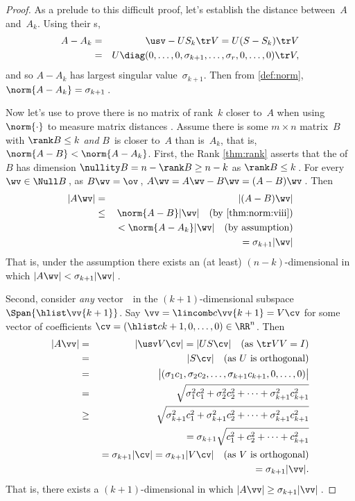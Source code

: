 \begin{proof} 
As a prelude to this difficult proof, let's establish the distance between~\(A\) and~\(A_k\). 
Using their \svd{}s,
\begin{eqnarray*}
A-A_k&=&\usv-US_k\tr V=U(S-S_k)\tr V
\\&=&U\diag(0,\ldots,0,\sigma_{k+1},\ldots,\sigma_r,0,\ldots,0)\tr V,
\end{eqnarray*}
and so \(A-A_k\) has largest singular value~\(\sigma_{k+1}\).
Then from \cref{def:norm}, \(\norm{A-A_k}=\sigma_{k+1}\)\,.

Now let's use  to prove there is no matrix of rank~\(k\) closer to~\(A\) when using \(\norm{\cdot}\) to measure matrix distances \cite[p.36]{Trefethen1997}.
Assume there is some \(m\times n\) matrix~\(B\) with \(\rank B\leq k\) \emph{and} \(B\)~is closer to~\(A\) than is~\(A_k\), that is, \(\norm{A-B}<\norm{A-A_k}\).
First, the Rank \cref{thm:rank} asserts that the  of~\(B\) has dimension \(\nullity B =n-\rank B\geq n-k\) as  \(\rank B\leq k\)\,.
For every \(\wv\in\Null B\)\,,  as \(B\wv=\ov\)\,,  \(A\wv=A\wv-B\wv=(A-B)\wv\)\,. 
Then
\begin{eqnarray*}
|A\wv|&=&|(A-B)\wv|
\\&\leq&\norm{A-B}|\wv| 
\quad(\text{by \cref{thm:norm:viii}})
\\&&{}<\norm{A-A_k}|\wv|
\quad(\text{by assumption})
\\&&\phantom{{}<}{}=\sigma_{k+1}|\wv|
\end{eqnarray*}
That is, under the assumption there exists an (at least) \((n-k)\)-dimensional  in which \(|A\wv|<\sigma_{k+1}|\wv|\)\,.

Second, consider \emph{any} vector~\vv\ in the \((k+1)\)-dimensional subspace \(\Span\{\hlist\vv{k+1}\}\).
Say \(\vv=\lincomb c\vv{k+1}=V\cv\) for some vector of coefficients \(\cv=(\hlist c{k+1},0,\ldots,0)\in\RR^n\).
Then
\begin{eqnarray*}
|A\vv|&=&|\usv V\cv|
=|US\cv| \quad(\text{as }\tr VV=I)
\\&=&|S\cv| \quad(\text{as \(U\) is orthogonal})
\\&=&\big|(\sigma_1c_1,\sigma_2c_2,\ldots,\sigma_{k+1}c_{k+1},0,\ldots,0)\big|
\\&=&\sqrt{\sigma_1^2c_1^2+\sigma_2^2c_2^2+\cdots+\sigma_{k+1}^2c_{k+1}^2}
\\&\geq&\sqrt{\sigma_{k+1}^2c_1^2+\sigma_{k+1}^2c_2^2+\cdots+\sigma_{k+1}^2c_{k+1}^2}
\\&&{}=\sigma_{k+1}\sqrt{c_1^2+c_2^2+\cdots+c_{k+1}^2}
\\&&{}=\sigma_{k+1}|\cv|
=\sigma_{k+1}|V\cv|\quad(\text{as \(V\) is orthogonal})
\\&&{}=\sigma_{k+1}|\vv|.
\end{eqnarray*}
That is, there exists a \((k+1)\)-dimensional  in which \(|A\vv|\geq\sigma_{k+1}|\vv|\)\,.


\end{proof}
